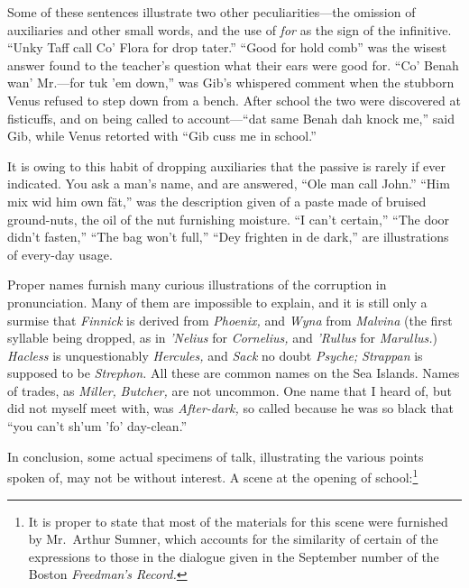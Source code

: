 \documentclass[a5paper,10pt]{book}
\begin{document}
Some of these sentences illustrate two other peculiarities---the
omission of auxiliaries and other small words, and the use of
\emph{for} as the sign of the infinitive.  ``Unky Taff call Co' Flora
for drop tater.''  ``Good for hold comb'' was the wisest answer found
to the teacher's question what their ears were good for.  ``Co' Benah
wan' Mr.---for tuk 'em down,'' was Gib's whispered comment when the
stubborn Venus refused to step down from a bench.  After school the
two were discovered at fisticuffs, and on being called to
account---``dat same Benah dah knock me,'' said Gib, while Venus
retorted with ``Gib cuss me in school.''

It is owing to this habit of dropping auxiliaries that the passive is
rarely if ever indicated.  You ask a man's name, and are answered,
``Ole man call John.''  ``Him mix wid him own f\"at,'' was the
description given of a paste made of bruised ground-nuts, the oil of
the nut furnishing moisture.  ``I can't certain,'' ``The door didn't
fasten,'' ``The bag won't full,'' ``Dey frighten in de dark,'' are
illustrations of every-day usage.

Proper names furnish many curious illustrations of the corruption in
pronunciation.  Many of them are impossible to explain, and it is
still only a surmise that \emph{Finnick} is derived from
\emph{Phoenix,} and \emph{Wyna} from \emph{Malvina} (the first
syllable being dropped, as in \emph{'Nelius} for \emph{Cornelius,} and
\emph{'Rullus} for \emph{Marullus.})  \emph{Hacless} is unquestionably
\emph{Hercules,} and \emph{Sack} no doubt \emph{Psyche;}
\emph{Strappan} is supposed to be \emph{Strephon.}  All these are
common names on the Sea Islands.  Names of trades, as \emph{Miller,}
\emph{Butcher,} are not uncommon.  One name that I heard of, but did
not myself meet with, was \emph{After-dark,} so called because he was
so black that ``you can't sh'um 'fo' day-clean.''

In conclusion, some actual specimens of talk, illustrating the various
points spoken of, may not be without interest.  A scene at the opening
of school:\footnote{It is proper to state that most of the materials
for this scene were furnished by Mr.~Arthur Sumner, which accounts for
the similarity of certain of the expressions to those in the dialogue
given in the September number of the Boston \emph{Freedman's Record.}}
\end{document}
